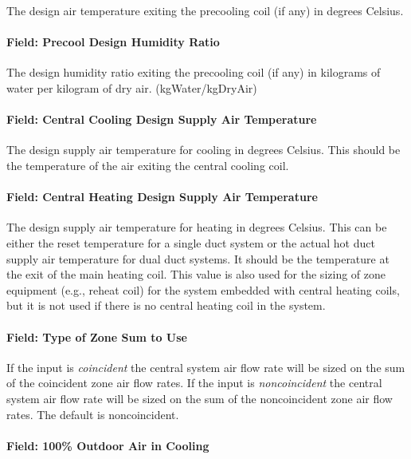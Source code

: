 The design air temperature exiting the precooling coil (if any) in degrees Celsius.

\paragraph{Field: Precool Design Humidity Ratio}\label{field-precool-design-humidity-ratio}

The design humidity ratio exiting the precooling coil (if any) in kilograms of water per kilogram of dry air. (kgWater/kgDryAir)

\paragraph{Field: Central Cooling Design Supply Air Temperature}\label{field-central-cooling-design-supply-air-temperature}

The design supply air temperature for cooling in degrees Celsius. This should be the temperature of the air exiting the central cooling coil.

\paragraph{Field: Central Heating Design Supply Air Temperature}\label{field-central-heating-design-supply-air-temperature}

The design supply air temperature for heating in degrees Celsius. This can be either the reset temperature for a single duct system or the actual hot duct supply air temperature for dual duct systems. It should be the temperature at the exit of the main heating coil. This value is also used for the sizing of zone equipment (e.g., reheat coil) for the system embedded with central heating coils, but it is not used if there is no central heating coil in the system.

\paragraph{Field: Type of Zone Sum to Use}\label{field-type-of-zone-sum-to-use}

If the input is \emph{coincident} the central system air flow rate will be sized on the sum of the coincident zone air flow rates. If the input is \emph{noncoincident} the central system air flow rate will be sized on the sum of the noncoincident zone air flow rates. The default is noncoincident.

\paragraph{Field: 100\% Outdoor Air in Cooling}\label{field-100-outdoor-air-in-cooling}

